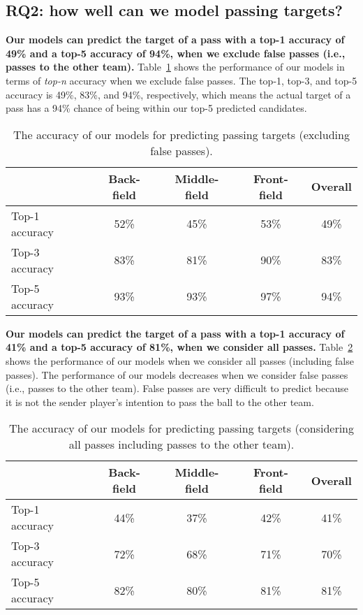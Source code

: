 \subsection{RQ2: how well can we model passing targets?}\label{RQ2-results}

\textbf{Our models can predict the target of a pass with a top-1 accuracy of 49\% and a top-5 accuracy of 94\%, when we exclude false passes (i.e., passes to the other team).}
Table~\ref{tab:performance-accurate-passes} shows the performance of our models in terms of \textit{top-n} accuracy when we exclude false passes. 
The top-1, top-3, and top-5 accuracy is 49\%, 83\%, and 94\%, respectively, which means the actual target of a pass has a 94\% chance of being within our top-5 predicted candidates.

\begin{table}[!t]
\caption{The accuracy of our models for predicting passing targets (excluding false passes).}
\centering
\begin{tabular}{lcccc}
  \hline
  & Back-field & Middle-field & Front-field & Overall \\
  \hline
  Top-1 accuracy & 52\% & 45\% & 53\% & 49\% \\
  Top-3 accuracy & 83\% & 81\% & 90\% & 83\% \\
  Top-5 accuracy & 93\% & 93\% & 97\% & 94\% \\
  \hline
\end{tabular}
\label{tab:performance-accurate-passes}
\end{table}

\textbf{Our models can predict the target of a pass with a top-1 accuracy of 41\% and a top-5 accuracy of 81\%, when we consider all passes.}
Table~\ref{tab:performance-all-passes} shows the performance of our models when we consider all passes (including false passes). 
The performance of our models decreases when we consider false passes (i.e., passes to the other team). 
False passes are very difficult to predict because it is not the sender player's intention to pass the ball to the other team. 

\begin{table}[!t]
\caption{The accuracy of our models for predicting passing targets (considering all passes including passes to the other team).}
\centering
\begin{tabular}{lcccc}
  \hline
  & Back-field & Middle-field & Front-field & Overall \\
  \hline
  Top-1 accuracy & 44\% & 37\% & 42\% & 41\% \\
  Top-3 accuracy & 72\% & 68\% & 71\% & 70\% \\
  Top-5 accuracy & 82\% & 80\% & 81\% & 81\% \\
  \hline
\end{tabular}
\label{tab:performance-all-passes}
\end{table}

